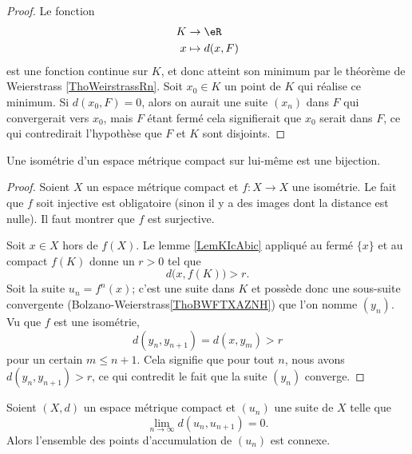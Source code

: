 \begin{proof}
    Le fonction 
    \begin{equation}
        \begin{aligned}
             K&\to \eR \\
            x&\mapsto d(x,F) 
        \end{aligned}
    \end{equation}
    est une fonction continue sur \( K\), et donc atteint son minimum par le théorème de Weierstrass \ref{ThoWeirstrassRn}. Soit \( x_0\in K\) un point de \( K\) qui réalise ce minimum. Si \( d(x_0,F)=0\), alors on aurait une suite \( (x_n)\) dans \( F\) qui convergerait vers \( x_0\), mais \( F\) étant fermé cela signifierait que \( x_0\) serait dans \( F\), ce qui contredirait l'hypothèse que \( F\) et \( K\) sont disjoints.
\end{proof}

\begin{proposition}
    Une isométrie d'un espace métrique compact sur lui-même est une bijection.
\end{proposition}

\begin{proof}
    Soient \( X\) un espace métrique compact et \( f\colon X\to X\) une isométrie. Le fait que \( f\) soit injective est obligatoire (sinon il y a des images dont la distance est nulle). Il faut montrer que \( f\) est surjective.

    Soit \( x\in X\) hors de \( f(X)\). Le lemme \ref{LemKIcAbic} appliqué au fermé \( \{ x \}\) et au compact \( f(K)\) donne un \( r>0\) tel que
    \begin{equation}
        d\big( x,f(K)\big)>r.
    \end{equation}
    Soit la suite \( u_n=f^n(x)\); c'est une suite dans \( K\) et possède donc une sous-suite convergente (Bolzano-Weierstrass\ref{ThoBWFTXAZNH}) que l'on nomme \( (y_n)\). Vu que \( f\) est une isométrie,
    \begin{equation}
        d(y_{n},y_{n+1})=d(x,y_m)>r
    \end{equation}
    pour un certain \( m\leq n+1\). Cela signifie que pour tout \( n\), nous avons \( d(y_n,y_{n+1})>r\), ce qui contredit le fait que la suite \( (y_n)\) converge.
\end{proof}

\begin{proposition} \label{PropLHWACDU}
    Soient \( (X,d)\) un espace métrique compact et \( (u_n)\) une suite de \( X\) telle que
    \begin{equation}
        \lim_{n\to \infty} d(u_n,u_{n+1})=0.
    \end{equation}
    Alors l'ensemble des points d'accumulation de \( (u_n)\) est connexe.
\end{proposition}

